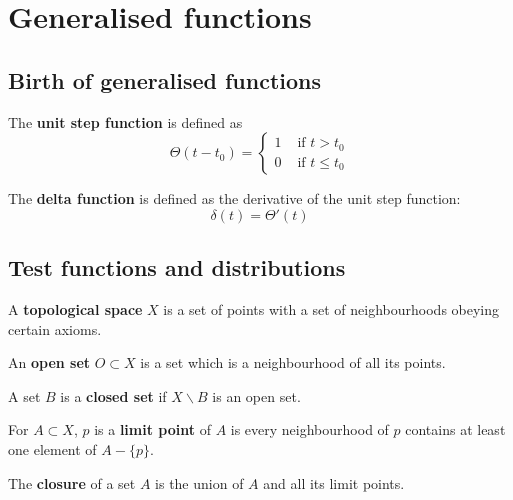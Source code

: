 \section{Generalised functions}

\subsection{Birth of generalised functions}

\begin{definition}
	The \textbf{unit step function} is defined as
	\[
		\Theta (t - t_0) = \begin{cases}
			1 & \text{ if } t > t_0 \\
			0 & \text{ if } t \le t_0
		\end{cases}
	\]
\end{definition}

\begin{definition}
	The \textbf{delta function} is defined as the derivative of the unit step function:
	\[
		\delta(t) = \Theta'(t)
	\]
\end{definition}

\subsection{Test functions and distributions}

\begin{definition}
	A \textbf{topological space} $X$ is a set of points with a set of neighbourhoods obeying certain axioms.
\end{definition}

\begin{definition}
	An \textbf{open set} $O \subset X$ is a set which is a neighbourhood of all its points.
\end{definition}

\begin{definition}
	A set $B$ is a \textbf{closed set} if $X \backslash B$ is an open set.
\end{definition}

\begin{definition}
	For $A \subset X$, $p$ is a \textbf{limit point} of $A$ is every neighbourhood of $p$ contains at least one element of $A - \{ p \}$.
\end{definition}

\begin{definition}
	The \textbf{closure} of a set $A$ is the union of $A$ and all its limit points.
\end{definition}

